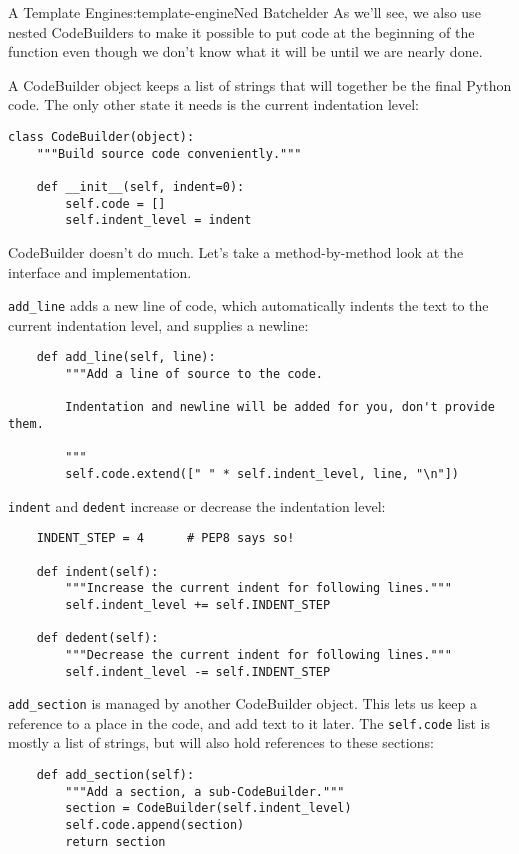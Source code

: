 \begin{aosachapter}{A Template Engine}{s:template-engine}{Ned Batchelder}
As we'll see, we also use nested CodeBuilders to make it possible to put
code at the beginning of the function even though we don't know what it
will be until we are nearly done.

A CodeBuilder object keeps a list of strings that will together be the
final Python code. The only other state it needs is the current
indentation level:

\begin{verbatim}
class CodeBuilder(object):
    """Build source code conveniently."""

    def __init__(self, indent=0):
        self.code = []
        self.indent_level = indent
\end{verbatim}

CodeBuilder doesn't do much. Let's take a method-by-method look at the
interface and implementation.

\texttt{add\_line} adds a new line of code, which automatically indents
the text to the current indentation level, and supplies a newline:

\begin{verbatim}
    def add_line(self, line):
        """Add a line of source to the code.

        Indentation and newline will be added for you, don't provide them.

        """
        self.code.extend([" " * self.indent_level, line, "\n"])
\end{verbatim}

\texttt{indent} and \texttt{dedent} increase or decrease the indentation
level:

\begin{verbatim}
    INDENT_STEP = 4      # PEP8 says so!

    def indent(self):
        """Increase the current indent for following lines."""
        self.indent_level += self.INDENT_STEP

    def dedent(self):
        """Decrease the current indent for following lines."""
        self.indent_level -= self.INDENT_STEP
\end{verbatim}

\texttt{add\_section} is managed by another CodeBuilder object. This
lets us keep a reference to a place in the code, and add text to it
later. The \texttt{self.code} list is mostly a list of strings, but will
also hold references to these sections:

\begin{verbatim}
    def add_section(self):
        """Add a section, a sub-CodeBuilder."""
        section = CodeBuilder(self.indent_level)
        self.code.append(section)
        return section
\end{verbatim}


\end{aosachapter}
